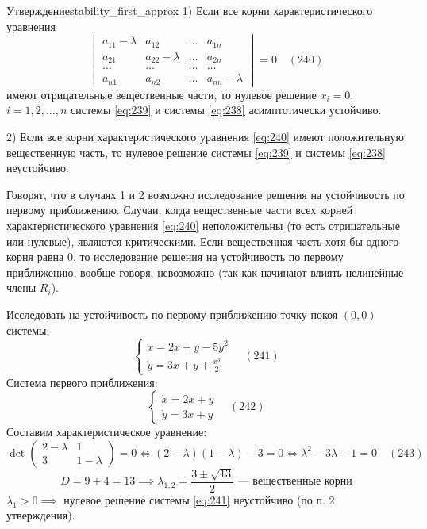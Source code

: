 \begin{theorem}{Утверждение}{stability_first_approx}
	1) Если все корни характеристического уравнения
	\begin{equation} \label{eq:240}
		\begin{vmatrix}
			a_{11} - \lambda & a_{12} & \dots & a_{1n} \\
			a_{21} & a_{22} - \lambda & \dots & a_{2n} \\
			\dots & \dots & \dots & \dots \\
			a_{n1} & a_{n2} & \dots & a_{nn} - \lambda
		\end{vmatrix} = 0 \quad (240)
	\end{equation}
	имеют отрицательные вещественные части, то нулевое решение $x_i = 0$, $i=1,2,\dots,n$ системы \eqref{eq:239} и системы \eqref{eq:238} асимптотически устойчиво.
	
	2) Если все корни характеристического уравнения \eqref{eq:240} имеют положительную вещественную часть, то нулевое решение системы \eqref{eq:239} и системы \eqref{eq:238} неустойчиво.
\end{theorem}

Говорят, что в случаях 1 и 2 возможно исследование решения на устойчивость по первому приближению. Случаи, когда вещественные части всех корней характеристического уравнения \eqref{eq:240} неположительны (то есть отрицательные или нулевые), являются критическими.
Если вещественная часть хотя бы одного корня равна $0$, то исследование решения на устойчивость по первому приближению, вообще говоря, невозможно (так как начинают влиять нелинейные члены $R_i$).

\begin{example}
	Исследовать на устойчивость по первому приближению точку покоя $(0,0)$ системы:
	\begin{equation} \label{eq:241}
		\begin{cases}
			\dot{x} = 2x + y - 5y^2 \\
			\dot{y} = 3x + y + \frac{x^3}{2}
		\end{cases} \quad (241)
	\end{equation}
	Система первого приближения:
	\begin{equation} \label{eq:242}
		\begin{cases}
			\dot{x} = 2x + y \\
			\dot{y} = 3x + y
		\end{cases} \quad (242)
	\end{equation}
	Составим характеристическое уравнение:
	\begin{equation} \label{eq:243}
		\det \begin{pmatrix} 2-\lambda & 1 \\ 3 & 1-\lambda \end{pmatrix} = 0 \iff (2-\lambda)(1-\lambda) - 3 = 0 \iff \lambda^2 - 3\lambda - 1 = 0 \quad (243)
	\end{equation}
	\begin{equation*}
		D = 9 + 4 = 13 \implies \lambda_{1,2} = \frac{3 \pm \sqrt{13}}{2} \text{ --- вещественные корни}
	\end{equation*}
	$\lambda_1 > 0 \implies$ нулевое решение системы \eqref{eq:241} неустойчиво (по п. 2 утверждения).
\end{example}


